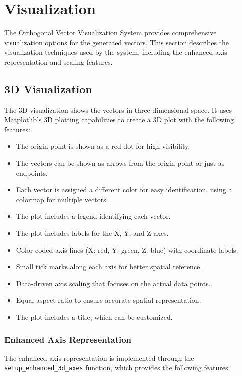 \newpage
\section{Visualization}

The Orthogonal Vector Visualization System provides comprehensive visualization options for the generated vectors. This section describes the visualization techniques used by the system, including the enhanced axis representation and scaling features.

\subsection{3D Visualization}

The 3D visualization shows the vectors in three-dimensional space. It uses Matplotlib's 3D plotting capabilities to create a 3D plot with the following features:

\begin{itemize}
    \item The origin point is shown as a red dot for high visibility.
    \item The vectors can be shown as arrows from the origin point or just as endpoints.
    \item Each vector is assigned a different color for easy identification, using a colormap for multiple vectors.
    \item The plot includes a legend identifying each vector.
    \item The plot includes labels for the X, Y, and Z axes.
    \item Color-coded axis lines (X: red, Y: green, Z: blue) with coordinate labels.
    \item Small tick marks along each axis for better spatial reference.
    \item Data-driven axis scaling that focuses on the actual data points.
    \item Equal aspect ratio to ensure accurate spatial representation.
    \item The plot includes a title, which can be customized.
\end{itemize}

\subsubsection{Enhanced Axis Representation}

The enhanced axis representation is implemented through the \texttt{setup\_enhanced\_3d\_axes} function, which provides the following features:

